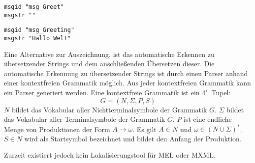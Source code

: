 \begin{lstlisting}[caption={Erstelltes .po},label={lst:xgettext}]
msgid "msg_Greet"
msgstr ""
\end{lstlisting}
\begin{lstlisting}[caption={Übersetztes .po},label={lst:translate}]
msgid "msg_Greeting"
msgstr "Hallo Welt"
\end{lstlisting}
\par
Eine Alternative zur Auszeichnung, ist das automatische Erkennen zu übersetzender Strings und dem anschließenden Übersetzen dieser. Die automatische Erkennung zu übersetzender Strings ist durch einen Parser anhand einer kontextfreien Grammatik möglich. 
\autocite[Vgl.][S. 556]{Wang.2009}
\autocite[Vgl.][S. 6]{Leiva.2015}
Aus jeder kontextfreien Grammatik kann ein Parser generiert werden.
\autocite[Vgl.][S. 240 - 246]{Unger.1968}
Eine kontextfreie Grammatik ist ein 4"~Tupel:
\begin{equation}
G = (N, \Sigma, P, S)
\end{equation}
$N$ bildet das Vokabular aller Nichtterminalsymbole der Grammatik $G$. $\Sigma$ bildet das Vokabular aller Terminalsymbole der Grammatik $G$. $P$ ist eine endliche Menge von Produktionen der Form $A \rightarrow \omega$. Es gilt $A \in N$ und $\omega \in (N \cup \Sigma)^*$. $S \in N$ wird als Startsymbol bezeichnet und bildet den Anfang der Produktion.
\autocite[Vgl.][S. 614]{Korenjak.1969}
\par
Zurzeit existiert jedoch kein Lokalisierungstool für \ac{MEL} oder \ac{MXML}.
